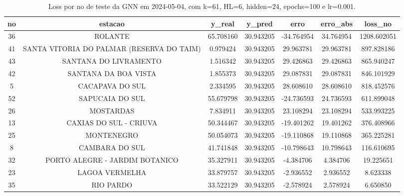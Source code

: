 \begin{table}[h]
\centering
\caption{Loss por no de teste da GNN em 2024-05-04, com k=61, HL=6, hidden=24, epochs=100 e lr=0.001.}
\label{tab:gnn_loss_k61_hl6_h24_e100_d20240504}
\begin{tabular}{ccccccc}
\toprule
no & estacao & y\_real & y\_pred & erro & erro\_abs & loss\_no \\
\midrule
36 & ROLANTE & 65.708160 & 30.943205 & -34.764954 & 34.764954 & 1208.602051 \\
41 & SANTA VITORIA DO PALMAR (RESERVA DO TAIM) & 0.979424 & 30.943205 & 29.963781 & 29.963781 & 897.828186 \\
43 & SANTANA DO LIVRAMENTO & 1.516342 & 30.943205 & 29.426863 & 29.426863 & 865.940247 \\
42 & SANTANA DA BOA VISTA & 1.855373 & 30.943205 & 29.087831 & 29.087831 & 846.101929 \\
5 & CACAPAVA DO SUL & 2.334595 & 30.943205 & 28.608610 & 28.608610 & 818.452576 \\
52 & SAPUCAIA DO SUL & 55.679798 & 30.943205 & -24.736593 & 24.736593 & 611.899048 \\
26 & MOSTARDAS & 7.834911 & 30.943205 & 23.108294 & 23.108294 & 533.993225 \\
13 & CAXIAS DO SUL - CRIUVA & 50.344467 & 30.943205 & -19.401262 & 19.401262 & 376.408966 \\
25 & MONTENEGRO & 50.054073 & 30.943205 & -19.110868 & 19.110868 & 365.225281 \\
8 & CAMBARA DO SUL & 41.741848 & 30.943205 & -10.798643 & 10.798643 & 116.610695 \\
32 & PORTO ALEGRE - JARDIM BOTANICO & 35.327911 & 30.943205 & -4.384706 & 4.384706 & 19.225651 \\
23 & LAGOA VERMELHA & 33.879757 & 30.943205 & -2.936552 & 2.936552 & 8.623338 \\
35 & RIO PARDO & 33.522129 & 30.943205 & -2.578924 & 2.578924 & 6.650850 \\
\bottomrule
\end{tabular}
\end{table}
